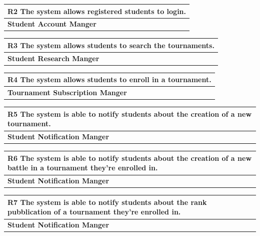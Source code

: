 \documentclass[12pt, a4paper]{report}
\begin{document}
\begin{table}[H]
    \begin{tabularx}{\textwidth}{X}
    \textbf{R2} The system allows registered students to login.\\
    \hline 
    \textbf{Student Account Manger}
\end{tabularx}
\end{table}

\begin{table}[H]
    \begin{tabularx}{\textwidth}{X}
    \textbf{R3} The system allows students to search the tournaments.\\
    \hline 
    \textbf{Student Research Manger}
    \end{tabularx}
\end{table}

\begin{table}[H]
    \begin{tabularx}{\textwidth}{X}
    \textbf{R4} The system allows students to enroll in a tournament.\\
    \hline 
    \textbf{Tournament Subscription Manger}
    \end{tabularx}
\end{table}

\begin{table}[H]
    \begin{tabularx}{\textwidth}{X}
    \textbf{R5} The system is able to notify students about the creation of a new tournament.\\
    \hline 
    \textbf{Student Notification Manger}
    \end{tabularx}
\end{table}

\begin{table}[H]
    \begin{tabularx}{\textwidth}{X}
    \textbf{R6} The system is able to notify students about the creation of a new battle in a tournament they’re enrolled in.\\
    \hline 
    \textbf{Student Notification Manger}
    \end{tabularx}
\end{table}

\begin{table}[H]
    \begin{tabularx}{\textwidth}{X}
    \textbf{R7} The system is able to notify students about the rank pubblication of a tournament they’re enrolled in.\\
    \hline 
    \textbf{Student Notification Manger}
    \end{tabularx}
\end{table}
\end{document}
